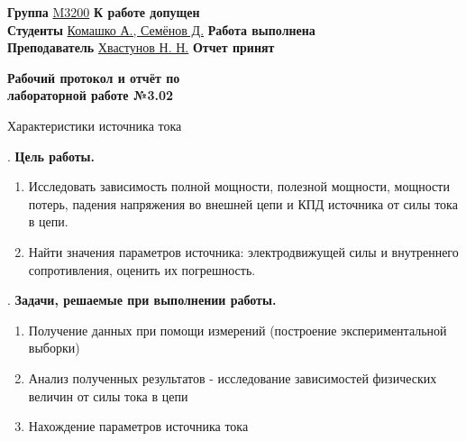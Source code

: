\documentclass[12pt]{article}
\begin{document}
    \vspace*{2\baselineskip}

    \thispagestyle{fancy}

    \noindent
    \textbf{Группа} \underline{M3200\hspace{4.5cm}} \hfill \textbf{К работе допущен} \underline{\hspace{4cm}} \\[0.5cm]
    \textbf{Студенты} \underline{Комашко А., Семёнов Д.\hspace{0.45cm}} \hfill \textbf{Работа выполнена} \underline{\hspace{4cm}} \\[0.5cm]
    \textbf{Преподаватель} \underline{Хвастунов Н. Н.\hspace{0.95cm}} \hfill \textbf{Отчет принят} \underline{\hspace{4.85cm}} \\


    \begin{center}
    {\huge \textbf{Рабочий протокол и отчёт по\\ лабораторной работе №3.02}}

        \smallvspace

        {\Large Характеристики источника тока}
    \end{center}


    . \textbf{Цель работы.}

    \begin{enumerate}
        \item Исследовать зависимость полной мощности, полезной мощности,
        мощности потерь, падения напряжения во внешней цепи и КПД
        источника от силы тока в цепи.
        
        \item Найти значения параметров источника: электродвижущей силы и
        внутреннего сопротивления, оценить их погрешность.
    \end{enumerate}

    \mediumvspace

    . \textbf{Задачи, решаемые при выполнении работы.}

    \begin{enumerate}
        \item Получение данных при помощи измерений (построение экспериментальной выборки)
        \item Анализ полученных результатов - исследование зависимостей физических величин от силы тока в цепи
        \item Нахождение параметров источника тока
    \end{enumerate}
\end{document}
